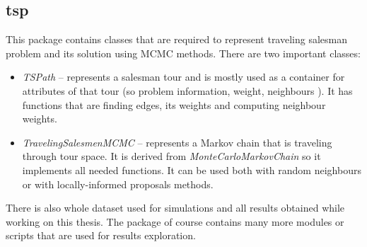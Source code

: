 \subsection{tsp}
	This package contains classes that are required to represent traveling salesman problem and its solution using MCMC methods. There are two important classes:
	\begin{itemize}
		\item \textit{TSPath} -- represents a salesman tour and is mostly used as a container for attributes of that tour (so problem information, weight, neighbours \etc). It has functions that are finding edges, its weights and computing neighbour weights.
		\item \textit{TravelingSalesmenMCMC} -- represents a Markov chain that is traveling through tour space. It is derived from \textit{MonteCarloMarkovChain} so it implements all needed functions. It can be used both with random neighbours or with locally-informed proposals methods.
	\end{itemize}
	There is also whole dataset used for simulations and all results obtained while working on this thesis. The package of course contains many more modules or scripts that are used for results exploration.